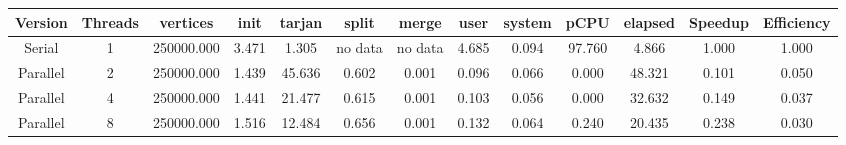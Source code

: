 \begin{tabular}{|c|c|c|c|c|c|c|c|c|c|c|c|c|}
\toprule
 Version &  Threads &   vertices &  init &  tarjan &   split &   merge &  user &  system &   pCPU &  elapsed &  Speedup &  Efficiency \\
\midrule
  Serial &        1 & 250000.000 & 3.471 &   1.305 & no data & no data & 4.685 &   0.094 & 97.760 &    4.866 &    1.000 &       1.000 \\
Parallel &        2 & 250000.000 & 1.439 &  45.636 &   0.602 &   0.001 & 0.096 &   0.066 &  0.000 &   48.321 &    0.101 &       0.050 \\
Parallel &        4 & 250000.000 & 1.441 &  21.477 &   0.615 &   0.001 & 0.103 &   0.056 &  0.000 &   32.632 &    0.149 &       0.037 \\
Parallel &        8 & 250000.000 & 1.516 &  12.484 &   0.656 &   0.001 & 0.132 &   0.064 &  0.240 &   20.435 &    0.238 &       0.030 \\
\bottomrule
\end{tabular}

